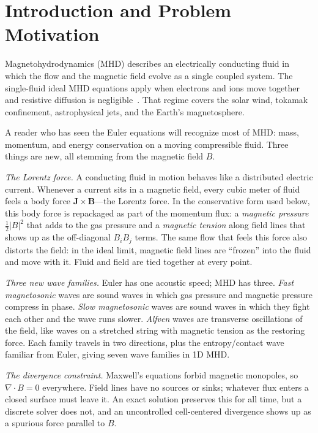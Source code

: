 \documentclass[11pt]{article}
\begin{document}
\makehomeworktitle
\tableofcontents
\clearpage

\section{Introduction and Problem Motivation}

Magnetohydrodynamics (MHD) describes an electrically conducting fluid in which the flow and the magnetic field evolve as a single coupled system.  The single-fluid ideal MHD equations apply when electrons and ions move together and resistive diffusion is negligible~\cite{chen2016,freidberg2014}.  That regime covers the solar wind, tokamak confinement, astrophysical jets, and the Earth's magnetosphere.

A reader who has seen the Euler equations will recognize most of MHD: mass, momentum, and energy conservation on a moving compressible fluid.  Three things are new, all stemming from the magnetic field $B$.

\emph{The Lorentz force.}  A conducting fluid in motion behaves like a distributed electric current.  Whenever a current sits in a magnetic field, every cubic meter of fluid feels a body force $\mathbf{J}\times\mathbf{B}$---the Lorentz force.  In the conservative form used below, this body force is repackaged as part of the momentum flux: a \emph{magnetic pressure} $\tfrac{1}{2}|B|^{2}$ that adds to the gas pressure and a \emph{magnetic tension} along field lines that shows up as the off-diagonal $B_iB_j$ terms.  The same flow that feels this force also distorts the field: in the ideal limit, magnetic field lines are ``frozen'' into the fluid and move with it.  Fluid and field are tied together at every point.

\emph{Three new wave families.}  Euler has one acoustic speed; MHD has three.  \emph{Fast magnetosonic} waves are sound waves in which gas pressure and magnetic pressure compress in phase.  \emph{Slow magnetosonic} waves are sound waves in which they fight each other and the wave runs slower.  \emph{Alfven} waves are transverse oscillations of the field, like waves on a stretched string with magnetic tension as the restoring force.  Each family travels in two directions, plus the entropy/contact wave familiar from Euler, giving seven wave families in 1D MHD.

\emph{The divergence constraint.}  Maxwell's equations forbid magnetic monopoles, so $\nabla\cdot B = 0$ everywhere.  Field lines have no sources or sinks; whatever flux enters a closed surface must leave it.  An exact solution preserves this for all time, but a discrete solver does not, and an uncontrolled cell-centered divergence shows up as a spurious force parallel to $B$.
\end{document}
